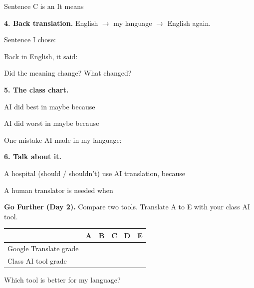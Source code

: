 \documentclass[11pt]{article}
\begin{document}
\vspace{0.6em}
Sentence C is an  It means 

\newpage

{\large\textbf{4. Back translation.}} English $\rightarrow$ my language $\rightarrow$ English again.

\vspace{0.6em}
Sentence I chose: 

\vspace{0.8em}
Back in English, it said: 

\vspace{0.8em}
Did the meaning change?  What changed? 

\vspace{1.1em}
{\large\textbf{5. The class chart.}}

\vspace{0.5em}
AI did best in  maybe because 

\vspace{0.8em}
AI did worst in  maybe because 

\vspace{0.8em}
One mistake AI made in my language: 

\vspace{1.1em}
{\large\textbf{6. Talk about it.}}

\vspace{0.5em}
A hospital (should / shouldn't) use AI translation, because 

\vspace{0.6em}
\blank{6.9in}

\vspace{0.8em}
A human translator is needed when 

\vspace{1.1em}
{\large\textbf{Go Further (Day 2).}} Compare two tools. Translate A to E with your class AI tool.

\vspace{0.3em}
\begin{tabular}{|R{2.2in}|c|c|c|c|c|}
\hline
 & \textbf{A} & \textbf{B} & \textbf{C} & \textbf{D} & \textbf{E} \\ \hline
Google Translate grade & & & & & \\[0.3em] \hline
Class AI tool grade & & & & & \\[0.3em] \hline
\end{tabular}

\vspace{0.6em}
Which tool is better for my language? 
\end{document}
